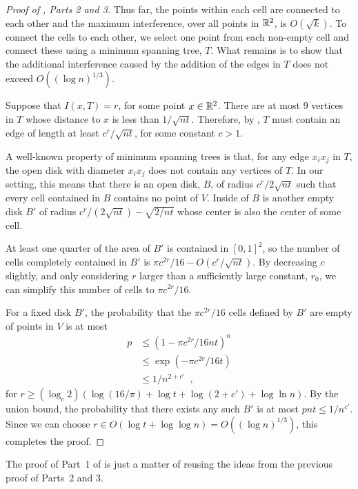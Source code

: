 \documentclass{patmorin}
\begin{document}
\begin{proof}[Proof of , Parts 2 and 3]
Thus far, the points within each cell are connected to each other and
the maximum interference, over all points in $\mathbb{R}^2$, is $O(\sqrt{k})$.
To connect the cells to each other, we select one point from each
non-empty cell and connect these using a minimum spanning tree, $T$.
What remains is to show that the additional interference caused by the
addition of the edges in $T$ does not exceed $O((\log n)^{1/3})$.

Suppose that $I(x,T)=r$, for some point $x\in\mathbb{R}^2$.  There are at most
9 vertices in $T$ whose distance to $x$ is less than $1/\sqrt{nt}$.
Therefore, by , $T$ must contain an edge of length at least
$c^r/\sqrt{nt}$, for some constant $c>1$.  

A well-known property of minimum spanning trees is that, for any edge
$x_ix_j$ in $T$, the open disk with diameter $x_ix_j$ does not contain
any vertices of $T$.  In our setting, this means that there is an open
disk, $B$, of radius $c^r/2\sqrt{nt}$ such that every cell contained in
$B$ contains no point of $V$.  Inside of $B$ is another empty disk $B'$
of radius $c^r/(2\sqrt{nt})-\sqrt{2/nt}$ whose center is also the center
of some cell.

At least one quarter of the area of $B'$ is contained in $[0,1]^2$,
so the number of cells completely contained in $B'$ is $\pi c^{2r}/16 -
O(c^{r}/\sqrt{nt})$.  By decreasing $c$ slightly, and only considering
$r$ larger than a sufficiently large constant, $r_0$, we can simplify
this number of cells to $\pi c^{2r}/16$.

For a fixed disk $B'$, the probability that the $\pi c^{2r}/16$ cells
defined by $B'$ are empty of points in $V$ is at most
\begin{align*}
 p 
  & \le (1-\pi c^{2r}/{16nt})^{n} \\
  & \le \exp(-\pi c^{2r}/16t) \\
 & \le 1/n^{2+c'} \enspace ,
\end{align*}
for $r\ge(\log_c2)(\log(16/\pi)+\log t + \log(2+c')+\log\ln n)$.  By the union bound, the
probability that there exists any such $B'$ is at most
$pnt\le 1/n^{c'}$.  Since we can choose $r\in O(\log t+\log\log n) = O((\log
n)^{1/3})$, this completes the proof.
\end{proof}

The proof of Part~1 of  is just a matter of reusing the ideas
from the previous proof of Parts~2 and 3.
\end{document}
